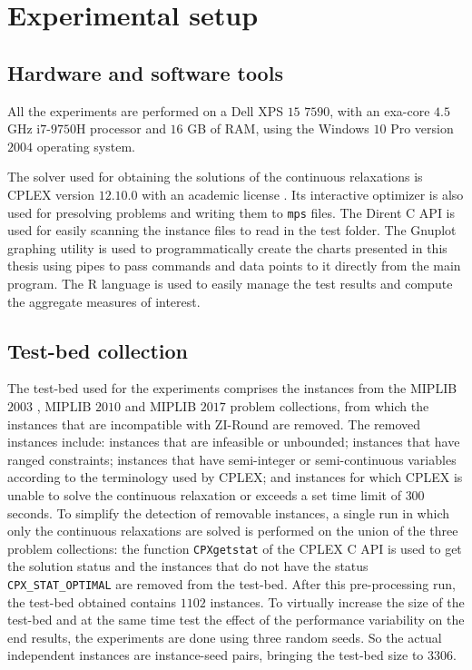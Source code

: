 \documentclass[a4paper,12pt]{book}
\begin{document}
\section{Experimental setup} \label{sec:expsetup}

\subsection{Hardware and software tools}
All the experiments are performed on a Dell XPS $15$ $7590$, with an exa-core $4.5$ GHz i$7$-$9750$H processor and $16$ GB of RAM, using the Windows $10$ Pro version $2004$ operating system. \par

The solver used for obtaining the solutions of the continuous relaxations is CPLEX version $12$.$10$.$0$ with an academic license \cite{cplex}. Its interactive optimizer is also used for presolving problems and writing them to \texttt{mps} files.
The Dirent C API \cite{dirent} is used for easily scanning the instance files to read in the test folder.
The Gnuplot \cite{gnuplot} graphing utility is used to programmatically create the charts presented in this thesis using pipes to pass commands and data points to it directly from the main program.
The R language \cite{rlang} is used to easily manage the test results and compute the aggregate measures of interest.

\subsection{Test-bed collection}

The test-bed used for the experiments comprises the instances from the MIPLIB $2003$ \cite{miplib2003}, MIPLIB $2010$ \cite{miplib2010} and MIPLIB $2017$ \cite{miplib2017} problem collections, from which the instances that are incompatible with ZI-Round are removed.
The removed instances include: instances that are infeasible or unbounded; instances that have ranged constraints; instances that have semi-integer or semi-continuous variables according to the terminology used by CPLEX; and instances for which CPLEX is unable to solve the continuous relaxation or exceeds a set time limit of $300$ seconds. To simplify the detection of removable instances, a single run in which only the continuous relaxations are solved is performed on the union of the three problem collections: the function \texttt{CPXgetstat} of the CPLEX C API is used to get the solution status and the instances that do not have the status \texttt{CPX\_STAT\_OPTIMAL} are removed from the test-bed. After this pre-processing run, the test-bed obtained contains $1102$ instances.
To virtually increase the size of the test-bed and at the same time test the effect of the performance variability on the end results, the experiments are done using three random seeds. So the actual independent instances are instance-seed pairs, bringing the test-bed size to $3306$. \par 
\end{document}
